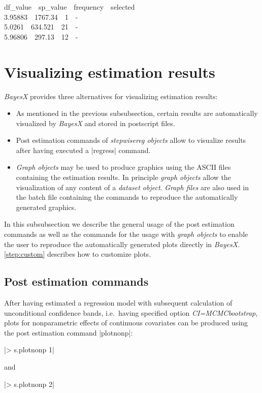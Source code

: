 {\footnotesize
df\_value \,\,   sp\_value \,\, frequency \,\, selected \\
3.95883 \,\,  1767.34  \,\, 1  \,\, - \\
5.0261 \,\,  634.521 \,\,  21  \,\, - \\
5.96806 \,\,  297.13 \,\,  12 \,\,  -}


\section{Visualizing estimation results}\label{step:visual}

{\it BayesX} provides three alternatives  for visualizing estimation results:
\begin{itemize}
\item As mentioned in the previous subsubsection, certain results are automatically visualized by {\it BayesX} and stored
    in postscript files. \item Post estimation commands of {\it stepwisereg objects} allow to visualize results after
    having executed a |regress| command. \item {\it Graph objects} may be used to produce graphics using the ASCII files
    containing the estimation results. In principle {\it graph objects} allow the visualization of any content of a {\it
    dataset object}. {\it Graph files} are also used in the batch file containing the commands to reproduce the
    automatically generated graphics.
\end{itemize}

In this subsubsection we describe the general usage of the post estimation commands as well as the commands for the usage with
{\it graph objects} to enable the user to reproduce the automatically generated plots directly in {\it BayesX}.
\ref{step:custom} describes how to customize plots.

\subsection{Post estimation commands}

After having estimated a regression model with subsequent calculation of unconditional confidence bands, i.e.~having specified
option {\it CI=MCMCbootstrap}, plots for nonparametric effects of continuous covariates can be produced using the post
estimation command |plotnonp|:

|> s.plotnonp 1|

and

|> s.plotnonp 2|

